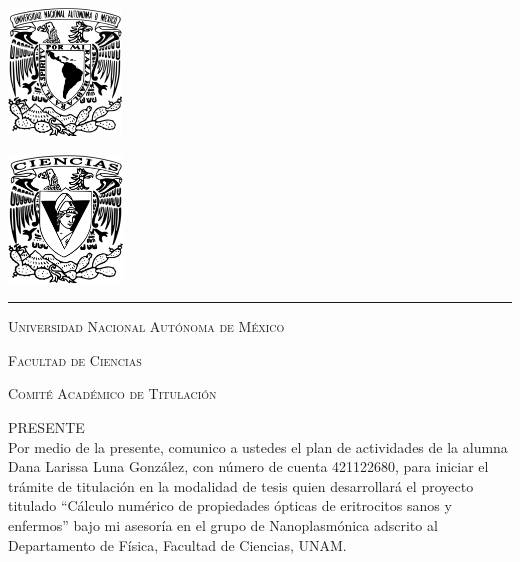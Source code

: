 \documentclass[11pt,letterpaper]{article}
\begin{document}
	
	
	\begin{center}
		\begin{minipage}{3cm}
			\begin{center}
				\includegraphics[height=3.4cm]{Logo_UNAM (1)}
			\end{center}
		\end{minipage}\hfill
		\begin{minipage}{3cm}
			\begin{center}
				\includegraphics[height=3.4cm]{Logo_FC (1)}
			\end{center}
		\end{minipage}
	\end{center}
	
	\rule{17cm}{0.1mm}
	
	\vspace{0.5cm}
	
	\hspace{10cm}{\raggedleft Ciudad Universitaria, 22 de abril de 2025}
	
	\hspace{1cm}
	
	\vspace{0.5cm}
	
	\textsc{Universidad Nacional Autónoma de México}
	
	\textsc{Facultad de Ciencias
	}
	
	\textsc{Comité Académico de Titulación
	}
	
	\textsc{PRESENTE}\\
	
	\noindent
	Por medio de la presente, comunico a ustedes el plan de actividades de la alumna Dana Larissa Luna González, con número de cuenta 421122680, para  iniciar el trámite de titulación en la modalidad de tesis quien desarrollará el proyecto titulado ``Cálculo numérico de propiedades ópticas de eritrocitos sanos y enfermos'' bajo mi asesoría en el grupo de Nanoplasmónica adscrito al Departamento de Física, Facultad de Ciencias, UNAM.\\
	
\end{document}
